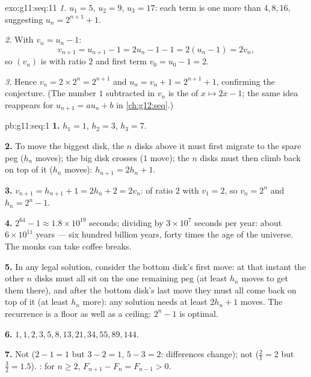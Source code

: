 \begin{solution}{exo:g11:seq:11}
\emph{1.} $u_1 = 5$, $u_2 = 9$, $u_3 = 17$: each term is one more than
$4, 8, 16$, suggesting $u_n = 2^{n+1} + 1$.

\emph{2.} With $v_n = u_n - 1$:
\[
v_{n+1} = u_{n+1} - 1 = 2u_n - 1 - 1 = 2(u_n - 1) = 2v_n,
\]
so $(v_n)$ is  with ratio $2$ and first term
$v_0 = u_0 - 1 = 2$.

\emph{3.} Hence $v_n = 2 \times 2^n = 2^{n+1}$ and
$u_n = v_n + 1 = 2^{n+1} + 1$, confirming the conjecture. (The number $1$
subtracted in $v_n$ is the  of $x \mapsto 2x - 1$; the same
idea reappears for $u_{n+1} = au_n + b$ in \cref{ch:g12:seq}.)
\end{solution}

\begin{solution}{pb:g11:seq:1}
\textbf{1.} $h_1 = 1$, $h_2 = 3$, $h_3 = 7$.

\textbf{2.} To move the biggest disk, the $n$ disks above it
must first migrate to the spare peg ($h_n$ moves); the big disk
crosses ($1$ move); the $n$ disks must then climb back on top
of it ($h_n$ moves): $h_{n+1} = 2h_n + 1$.

\textbf{3.} $v_{n+1} = h_{n+1} + 1 = 2h_n + 2 = 2v_n$:
 of ratio $2$ with $v_1 = 2$, so $v_n = 2^n$ and
$h_n = 2^n - 1$.

\textbf{4.} $2^{64} - 1 \approx 1.8 \times 10^{19}$ seconds;
dividing by $3 \times 10^7$ seconds per year:
about $6 \times 10^{11}$ years --- six hundred billion years,
forty times the age of the universe. The monks can take
coffee breaks.

\textbf{5.} In any legal solution, consider the bottom disk's
first move: at that instant the other $n$ disks must all sit on
the one remaining peg (at least $h_n$ moves to get them there),
and after the bottom disk's last move they must all come back
on top of it (at least $h_n$ more): any solution needs at least
$2h_n + 1$ moves. The recurrence is a floor as well as a
ceiling: $2^n - 1$ is optimal.

\textbf{6.} $1, 1, 2, 3, 5, 8, 13, 21, 34, 55, 89, 144$.

\textbf{7.} Not  ($2 - 1 = 1$ but $3 - 2 = 1$,
$5 - 3 = 2$: differences change); not 
($\frac21 = 2$ but $\frac32 = 1.5$). : for
$n \geq 2$, $F_{n+1} - F_n = F_{n-1} > 0$.


\end{solution}
